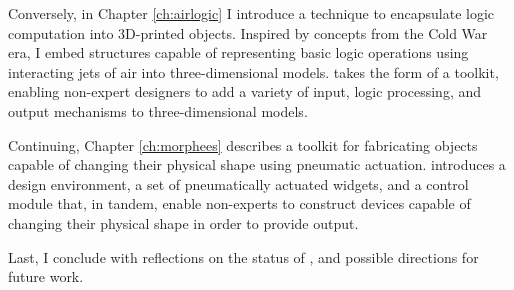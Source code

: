 		Conversely, in Chapter \ref{ch:airlogic} I introduce a technique to
		encapsulate logic computation into 3D-printed objects. Inspired by concepts
		from the Cold War era, I embed structures capable of representing basic
		logic operations using interacting jets of air into three-dimensional
		models. \al takes the form of a toolkit, enabling non-expert designers to
		add a variety of input, logic processing, and output mechanisms to
		three-dimensional models.

		Continuing, Chapter \ref{ch:morphees} describes a toolkit for fabricating
		objects capable of changing their physical shape using pneumatic actuation.
		\mp introduces a design environment, a set of pneumatically actuated
		widgets, and a control module that, in tandem, enable non-experts to
		construct devices capable of changing their physical shape in order to
		provide output.

		Last, I conclude with reflections on the status of \papf, and possible
		directions for future work.

		\newpage

